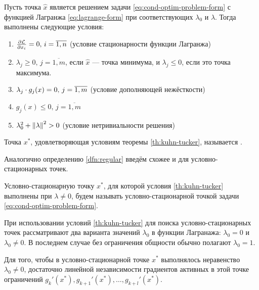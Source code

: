 \begin{thm}
  \label{th:kuhn-tucker}
  Пусть точка $\hat{x}$ является решением задачи
  \eqref{eq:cond-optim-problem-form} с функцией Лагранжа
  \eqref{eq:lagrange-form} при соответствующих $\lambda_0$ и
  $\lambda$. Тогда выполнены следующие условия:
  \begin{enumerate}
    \renewcommand{\labelenumi}{\emph{\asbuk{enumi})}}
  \item $\frac{\partial{\mathcal{L}}}{\partial{x_i}}=0,\, i=\overline{1,n}$ (условие
    стационарности функции Лагранжа)
  \item $\lambda_j \geq 0,\, j=\overline{1,m}$, если $\hat{x}$ — точка
    минимума, и $\lambda_j \leq 0$, если это точка максимума.
  \item $\lambda_j \cdot g_j(x) = 0,\, j=\overline{1,m}$ (условие
    дополняющей нежёсткости)
  \item $g_j(x) \leq 0,\, j=\overline{1,m}$
  \item $\lambda_0^2 + \left \lVert{\lambda}\right \rVert^2 > 0$ (условие нетривиальности решения)
  \end{enumerate}
\end{thm}

\begin{dfn}
  Точка $x^*$, удовлетворяющая условиям теоремы \ref{th:kuhn-tucker},
  называется .
\end{dfn}

Аналогично определению \ref{dfn:regular} введём схожее и для
условно-стационарных точек.
\begin{dfn}
  Условно-стационарную точку $x^*$, для которой условия
  \ref{th:kuhn-tucker} выполнены при $\lambda ≠ 0$, будем называть
   условно-стационарной точкой задачи
  \eqref{eq:cond-optim-problem-form}.
\end{dfn}

При использовании условий \ref{th:kuhn-tucker} для поиска
условно-стационарных точек рассматривают два варианта значений
$\lambda_0$ в функции Лагранажа: $\lambda_0=0$ и $\lambda_0 \neq 0$. В
последнем случае без ограничения общности обычно полагают $\lambda_0 =
1$.

\begin{thm}
  Для того, чтобы в условно-стационарной точке $x^*$ выполнялось
  неравенство $\lambda_0 \neq 0$, достаточно линейной независимости
  градиентов активных в этой точке ограничений $g_k'(x^*),
  g_{k+1}'(x^*), \dotsc, g_{k+l}'(x^*)$.
\end{thm}

